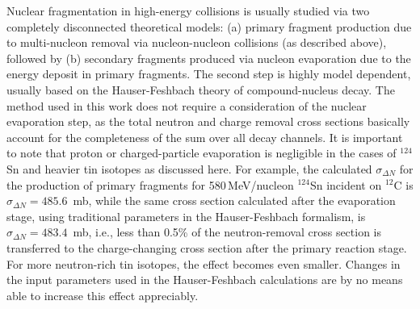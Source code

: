 \documentclass[english,aps,prl,twocolumn,superscriptaddress]{revtex4}
\begin{document}
Nuclear fragmentation in high-energy collisions  is usually studied via two completely disconnected theoretical models: (a) primary fragment production due to multi-nucleon removal via nucleon-nucleon collisions (as described above), followed by (b) secondary fragments produced via nucleon evaporation due to the energy deposit in primary fragments. The second step is highly model dependent, usually based on the Hauser-Feshbach theory of  compound-nucleus decay. The method used in this work does not require a consideration of the nuclear evaporation step, as the total neutron and charge removal cross sections basically account for the completeness of the sum over all decay channels. It is important to note that proton or charged-particle evaporation is negligible in the cases of $^{124}$Sn and heavier tin isotopes as discussed here. For example, the calculated $\sigma_{\Delta N}$ for the production of primary fragments for  580\,MeV/nucleon $^{124}$Sn incident on $^{12}$C is $\sigma_{\Delta N}=485.6$~mb, while the same cross section calculated after the evaporation stage, using traditional parameters in the Hauser-Feshbach formalism, is  $\sigma_{\Delta N}=483.4$~mb, i.e., less than 0.5\% of the neutron-removal cross section is transferred to the charge-changing cross section after the primary reaction stage. For more neutron-rich tin isotopes, the effect becomes even smaller. Changes in the input parameters used in the Hauser-Feshbach calculations are by no means able to increase this effect appreciably. 
\end{document}
